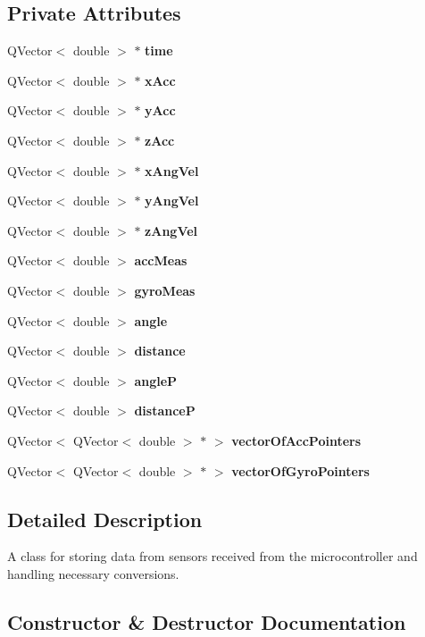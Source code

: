 \subsection*{Private Attributes}
\begin{DoxyCompactItemize}
\item 
Q\+Vector$<$ double $>$ $\ast$ \textbf{ time}
\item 
Q\+Vector$<$ double $>$ $\ast$ \textbf{ x\+Acc}
\item 
Q\+Vector$<$ double $>$ $\ast$ \textbf{ y\+Acc}
\item 
Q\+Vector$<$ double $>$ $\ast$ \textbf{ z\+Acc}
\item 
Q\+Vector$<$ double $>$ $\ast$ \textbf{ x\+Ang\+Vel}
\item 
Q\+Vector$<$ double $>$ $\ast$ \textbf{ y\+Ang\+Vel}
\item 
Q\+Vector$<$ double $>$ $\ast$ \textbf{ z\+Ang\+Vel}
\item 
Q\+Vector$<$ double $>$ \textbf{ acc\+Meas}
\item 
Q\+Vector$<$ double $>$ \textbf{ gyro\+Meas}
\item 
Q\+Vector$<$ double $>$ \textbf{ angle}
\item 
Q\+Vector$<$ double $>$ \textbf{ distance}
\item 
Q\+Vector$<$ double $>$ \textbf{ angleP}
\item 
Q\+Vector$<$ double $>$ \textbf{ distanceP}
\item 
Q\+Vector$<$ Q\+Vector$<$ double $>$ $\ast$ $>$ \textbf{ vector\+Of\+Acc\+Pointers}
\item 
Q\+Vector$<$ Q\+Vector$<$ double $>$ $\ast$ $>$ \textbf{ vector\+Of\+Gyro\+Pointers}
\end{DoxyCompactItemize}


\subsection{Detailed Description}
A class for storing data from sensors received from the microcontroller and handling necessary conversions. 

\subsection{Constructor \& Destructor Documentation}
\mbox{\label{class_measurement_handler_a80f0638e83958605b26eb39e4e8a49e4}} 
